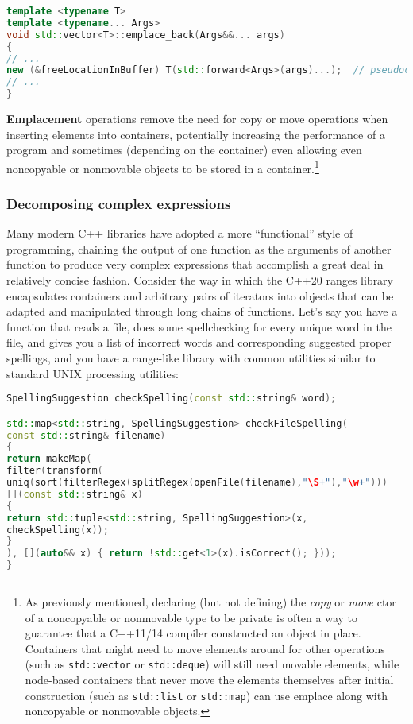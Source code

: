 \begin{lstlisting}[language=C++]
template <typename T>
template <typename... Args>
void std::vector<T>::emplace_back(Args&&... args)
{
// ...
new (&freeLocationInBuffer) T(std::forward<Args>(args)...);  // pseudocode
// ...
}
\end{lstlisting}

\noindent \textbf{Emplacement} operations remove the need for copy or move
operations when inserting elements into containers, potentially
increasing the performance of a program and sometimes (depending on the
container) even allowing even noncopyable or nonmovable objects to be stored
in a container.\footnote{As previously mentioned,
declaring (but not defining) the \emph{copy} or \emph{move} ctor of a
noncopyable or nonmovable type to be private is often a way to guarantee that
a C++11/14 compiler constructed an object in place.
Containers that might need to move elements around for other operations
(such as \texttt{std::vector} or \texttt{std::deque}) will still need
movable elements, while node-based containers that never move the
elements themselves after initial construction (such as
\texttt{std::list} or \texttt{std::map}) can use emplace along with
noncopyable or nonmovable objects.}

\subsubsection[Decomposing complex expressions]{Decomposing complex expressions}\label{decomposing-complex-expressions}

Many modern C++ libraries have adopted a more ``functional'' style of
programming, chaining the output of one function as the arguments of
another function to produce very complex expressions that accomplish a
great deal in relatively concise fashion. Consider the way in which the
C++20 ranges library encapsulates containers and arbitrary pairs of
iterators into objects that can be adapted and manipulated through long
chains of functions. Let's say you have a function that reads a file,
does some spellchecking for every unique word in the file, and gives you a
list of incorrect words and corresponding suggested proper spellings,
and you have a range-like library with common utilities similar to
standard UNIX processing utilities:

\begin{lstlisting}[language=C++]
SpellingSuggestion checkSpelling(const std::string& word);

std::map<std::string, SpellingSuggestion> checkFileSpelling(
const std::string& filename)
{
return makeMap(
filter(transform(
uniq(sort(filterRegex(splitRegex(openFile(filename),"\S+"),"\w+")))
[](const std::string& x)
{
return std::tuple<std::string, SpellingSuggestion>(x,
checkSpelling(x));
}
), [](auto&& x) { return !std::get<1>(x).isCorrect(); }));
}
\end{lstlisting}


